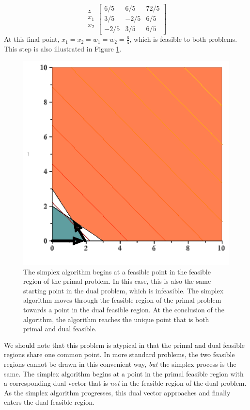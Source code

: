 \begin{equation}
\begin{array}{c}
z\\
x_1\\
x_2
\end{array}
\left[
\begin{array}{cc|c}
6/5	&	6/5	&	72/5\\
\hline
3/5	&	-2/5	&   6/5\\
-2/5	&	3/5	&	6/5
\end{array}
\right]
\end{equation}
At this final point, $x_1 = x_2 = w_1 = w_2 = \tfrac{6}{5}$, which is feasible to both problems. This step is also illustrated in Figure \ref{fig:PrimalDualFeasibleRegion-2}.
\begin{figure}[htbp]
\centering
\includegraphics[scale=0.5]{PrimalDualFeasibleRegion-2.pdf}
\caption{The simplex algorithm begins at a feasible point in the feasible region of the primal problem. In this case, this is also the same starting point in the dual problem, which is infeasible. The simplex algorithm moves through the feasible region of the primal problem towards a point in the dual feasible region. At the conclusion of the algorithm, the algorithm reaches the unique point that is both primal and dual feasible.}
\label{fig:PrimalDualFeasibleRegion-2} 
\end{figure}
We should note that this problem is atypical in that the primal and dual feasible regions share one common point. In more standard problems, the two feasible regions cannot be drawn in this convenient way, \textit{but} the simplex process is the same. The simplex algorithm begins at a point in the primal feasible region with a corresponding dual vector that is \textit{not} in the feasible region of the dual problem. As the simplex algorithm progresses, this dual vector approaches and finally enters the dual feasible region.

